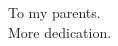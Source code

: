 
\begin{dedication}
\null\vfil
\begin{center}
To my parents.\\\vspace{12pt}
More dedication.
\end{center}
\vfil\null
\end{dedication}
